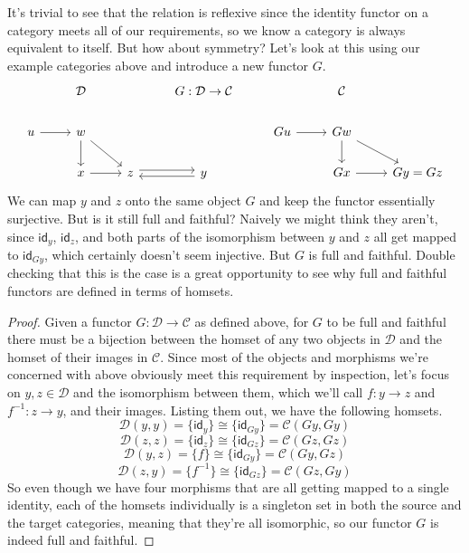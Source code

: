 \documentclass[12pt]{article}
\theoremstyle{definition}
\begin{document}
It's trivial to see that the relation is reflexive since the identity functor on a category meets all of our requirements, so we know a category is always equivalent to itself.
But how about symmetry?
Let's look at this using our example categories above and introduce a new functor $G$.
\[\begin{tikzcd}
        & {\mathcal{D}} && {G:\mathcal{D}\rightarrow\mathcal{C}} && {\mathcal{C}} \\
        u & w &&& Gu & Gw \\
        & x & z & y && Gx & {Gy=Gz}
        \arrow[from=2-1, to=2-2]
        \arrow[from=2-2, to=3-2]
        \arrow[from=3-2, to=3-3]
        \arrow[from=2-2, to=3-3]
        \arrow[from=2-5, to=2-6]
        \arrow[from=2-6, to=3-6]
        \arrow[from=2-6, to=3-7]
        \arrow[from=3-6, to=3-7]
        \arrow[shift left, from=3-3, to=3-4]
        \arrow[shift left, from=3-4, to=3-3]
    \end{tikzcd}\]
We can map $y$ and $z$ onto the same object $G$ and keep the functor essentially surjective.
But is it still full and faithful?
Naively we might think they aren't, since $\mathsf{id}_y$, $\mathsf{id}_z$, and both parts of the isomorphism between $y$ and $z$ all get mapped to $\mathsf{id}_{Gy}$, which certainly doesn't seem injective.
But $G$ is full and faithful.
Double checking that this is the case is a great opportunity to see why full and faithful functors are defined in terms of homsets.
\begin{proof}
    Given a functor $G: \mathcal{D} \rightarrow \mathcal{C}$ as defined above, for $G$ to be full and faithful there must be a bijection between the homset of any two objects in $\mathcal{D}$ and the homset of their images in $\mathcal{C}$.
    Since most of the objects and morphisms we're concerned with above obviously meet this requirement by inspection, let's focus on $y,z \in \mathcal{D}$ and the isomorphism between them, which we'll call $f:y\rightarrow z$ and $f^{-1}:z\rightarrow y$, and their images.
    Listing them out, we have the following homsets.
    $$\mathcal{D}(y, y) = \{\mathsf{id}_y\} \cong \{\mathsf{id}_{Gy}\} = \mathcal{C}(Gy, Gy)$$
    $$\mathcal{D}(z, z) = \{\mathsf{id}_z\} \cong \{\mathsf{id}_{Gz}\} = \mathcal{C}(Gz, Gz)$$
    $$\mathcal{D}(y, z) = \{f\} \cong \{\mathsf{id}_{Gy}\} = \mathcal{C}(Gy, Gz)$$
    $$\mathcal{D}(z, y) = \{f^{-1}\} \cong \{\mathsf{id}_{Gz}\} = \mathcal{C}(Gz, Gy)$$
    So even though we have four morphisms that are all getting mapped to a single identity, each of the homsets individually is a singleton set in both the source and the target categories, meaning that they're all isomorphic, so our functor $G$ is indeed full and faithful.
\end{proof}
\end{document}
